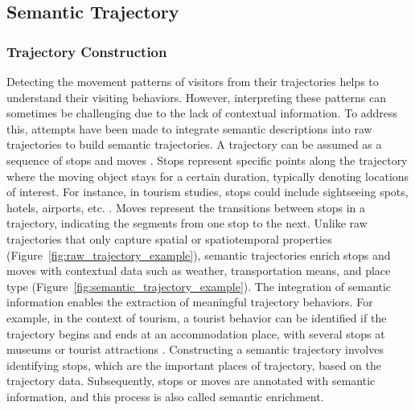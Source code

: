 \documentclass{article}
\theoremstyle{definition}
\theoremstyle{remark}
\begin{document}
\subsection{Semantic Trajectory} \label{semantic_trajectory}

\subsubsection{Trajectory Construction}
Detecting the movement patterns of visitors from their trajectories helps to understand their visiting behaviors. However, interpreting these patterns can sometimes be challenging due to the lack of contextual information. To address this, attempts have been made to integrate semantic descriptions into raw trajectories to build semantic trajectories. A trajectory can be assumed as a sequence of stops and moves \citep{spaccapietra_conceptual_2008}. Stops represent specific points along the trajectory where the moving object stays for a certain duration, typically denoting locations of interest. For instance, in tourism studies, stops could include sightseeing spots, hotels, airports, etc. \citep{yuan_review_2017}. Moves represent the transitions between stops in a trajectory, indicating the segments from one stop to the next. Unlike raw trajectories that only capture spatial or spatiotemporal properties (Figure~\ref{fig:raw_trajectory_example}), semantic trajectories enrich stops and moves with contextual data such as weather, transportation means, and place type (Figure~\ref{fig:semantic_trajectory_example}). The integration of semantic information enables the extraction of meaningful trajectory behaviors. For example, in the context of tourism, a tourist behavior can be identified if the trajectory begins and ends at an accommodation place, with several stops at museums or tourist attractions \citep{parent_semantic_2013}. Constructing a semantic trajectory involves identifying stops, which are the important places of trajectory, based on the trajectory data. Subsequently, stops or moves are annotated with semantic information, and this process is also called semantic enrichment.
\end{document}
